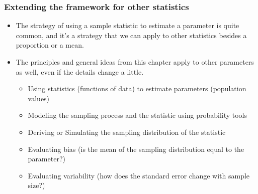 \documentclass[t,compress,mathserif]{beamer}
\begin{document}
\begin{frame}
\frametitle{Extending the framework for other statistics}

\begin{itemize}

\item The strategy of using a sample statistic to estimate a parameter is quite common, and it's a strategy that we can apply to other statistics besides a proportion or a mean.

\item The principles and general ideas from this chapter apply to other parameters as well, even if the details change a little. 
\begin{itemize}
    \item Using statistics (functions of data) to estimate parameters (population values)
    \item Modeling the sampling process and the statistic using probability tools
    \item Deriving or Simulating the sampling distribution of the statistic
    \item Evaluating bias (is the mean of the sampling distribution equal to the parameter?)
    \item Evaluating variability (how does the standard error change with sample size?)
\end{itemize}
\end{itemize}
\end{frame}

\end{document}
